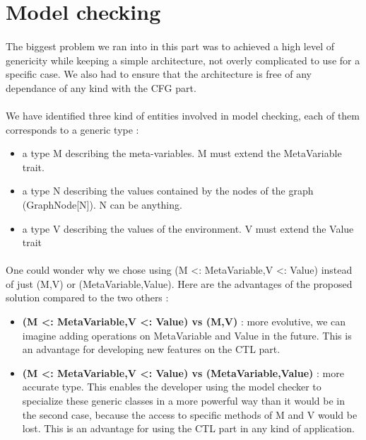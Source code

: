 \documentclass{report}
\begin{document}
\section{Model checking}

\paragraph{}
\hspace{4mm}The biggest problem we ran into in this part was to achieved a high level of genericity while keeping
a simple architecture, not overly complicated to use for a specific case. We also had to ensure that the architecture is
free of any dependance of any kind with the CFG part.

\paragraph{}
\hspace{4mm}We have identified three kind of entities involved in model checking, each of them corresponds to a generic type :

\vspace{1.5mm}
\begin{itemize}
\item a type M describing the meta-variables. M must extend the MetaVariable trait.\vspace{1mm}
\item a type N describing the values contained by the nodes of the graph (GraphNode[N]). N can be anything.\vspace{1mm}
\item a type V describing the values of the environment. V must extend the Value trait\vspace{1mm}
\end{itemize}

\paragraph{}
\hspace{4mm}One could wonder why we chose using (M <: MetaVariable,V <: Value) instead of 
just (M,V) or (MetaVariable,Value). Here are the advantages of the proposed solution compared to the two others :

\vspace{1.5mm}
\begin{itemize}
\item \textbf{(M <: MetaVariable,V <: Value) vs (M,V)} : more evolutive, we can imagine adding
operations on MetaVariable and Value in the future. This is an advantage for developing new features on the CTL part.\vspace{1mm}
\item \textbf{(M <: MetaVariable,V <: Value) vs (MetaVariable,Value)} : more accurate type. This enables the developer using the model checker to
specialize these generic classes in a more powerful way than it would be in the second case, because the access to specific methods of M and V would be lost.
This is an advantage for using the CTL part in any kind of application.\vspace{1mm}
\end{itemize}
\end{document}
